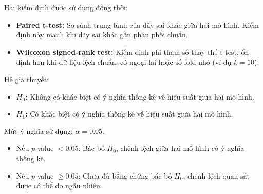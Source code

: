 Hai kiểm định được sử dụng đồng thời:
\begin{itemize} [labelsep=10pt, leftmargin=2cm]
    \item \textbf{Paired t-test:} So sánh trung bình của dãy sai khác giữa hai mô hình. Kiểm định này mạnh khi dãy sai khác gần phân phối chuẩn.
    \item \textbf{Wilcoxon signed-rank test:} Kiểm định phi tham số thay thế t-test, ổn định hơn khi dữ liệu lệch chuẩn, có ngoại lai hoặc số fold nhỏ (ví dụ $k=10$).
\end{itemize}

Hệ giả thuyết:
\begin{itemize} [labelsep=10pt, leftmargin=2cm]
    \item \textbf{$H_0$:} Không có khác biệt có ý nghĩa thống kê về hiệu suất giữa hai mô hình.
    \item \textbf{$H_1$:} Có khác biệt có ý nghĩa thống kê về hiệu suất giữa hai mô hình.
\end{itemize}

Mức ý nghĩa sử dụng: $\alpha=0.05$.
\begin{itemize} [labelsep=10pt, leftmargin=2cm]
    \item Nếu $p$-value $<0.05$: Bác bỏ $H_0$, chênh lệch giữa hai mô hình có ý nghĩa thống kê.
    \item Nếu $p$-value $\ge 0.05$: Chưa đủ bằng chứng bác bỏ $H_0$, chênh lệch quan sát được có thể do ngẫu nhiên.
\end{itemize}


